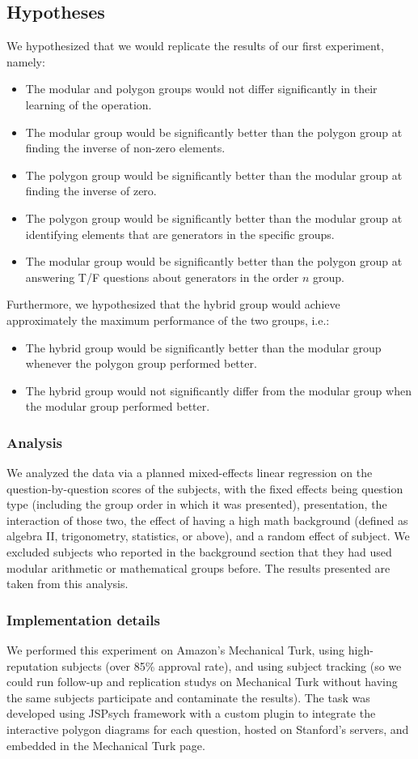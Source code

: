 \documentclass[11pt]{article}
\begin{document}
\subsection{Hypotheses}
We hypothesized that we would replicate the results of our first experiment, namely: 
\begin{itemize} 
\item The modular and polygon groups would not differ significantly in their learning of the operation.
\item The modular group would be significantly better than the polygon group at finding the inverse of non-zero elements.
\item The polygon group would be significantly better than the modular group at finding the inverse of zero.
\item The polygon group would be significantly better than the modular group at identifying elements that are generators in the specific groups.
\item The modular group would be significantly better than the polygon group at answering T/F questions about generators in the order $n$ group.
\end{itemize}
Furthermore, we hypothesized that the hybrid group would achieve approximately the maximum performance of the two groups, i.e.:
\begin{itemize}
\item The hybrid group would be significantly better than the modular group whenever the polygon group performed better.
\item The hybrid group would not significantly differ from the modular group when the modular group performed better.
\end{itemize}
\subsubsection{Analysis}
We analyzed the data via a planned mixed-effects linear regression on the question-by-question scores of the subjects, with the fixed effects being question type (including the group order in which it was presented), presentation, the interaction of those two, the effect of having a high math background (defined as algebra II, trigonometry, statistics, or above), and a random effect of subject. We excluded subjects who reported in the background section that they had used modular arithmetic or mathematical groups before. The results presented are taken from this analysis.
\subsubsection{Implementation details}
We performed this experiment on Amazon's Mechanical Turk, using high-reputation subjects (over 85\% approval rate), and using subject tracking (so we could run follow-up and replication studys on Mechanical Turk without having the same subjects participate and contaminate the results). The task was developed using JSPsych framework with a custom plugin to integrate the interactive polygon diagrams for each question, hosted on Stanford's servers, and embedded in the Mechanical Turk page.  
\end{document}
